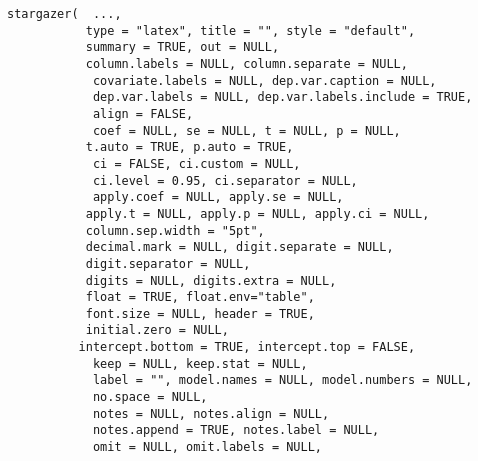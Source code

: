 \documentclass[11pt]{article}
\begin{document}
\verb+stargazer(  ..., +\\
 \verb+           type = "latex", title = "", style = "default", +\\
 \verb+           summary = TRUE, out = NULL,+\\
 \verb+           column.labels = NULL, column.separate = NULL,+\\
\verb+            covariate.labels = NULL, dep.var.caption = NULL,+\\
\verb+            dep.var.labels = NULL, dep.var.labels.include = TRUE, +\\
\verb+            align = FALSE, +\\
\verb+            coef = NULL, se = NULL, t = NULL, p = NULL,+\\
 \verb+           t.auto = TRUE, p.auto = TRUE,+\\
\verb+            ci = FALSE, ci.custom = NULL,+\\
\verb+            ci.level = 0.95, ci.separator = NULL,+\\
\verb+            apply.coef = NULL, apply.se = NULL, +\\
 \verb+           apply.t = NULL, apply.p = NULL, apply.ci = NULL,+\\
 \verb+           column.sep.width = "5pt",+\\
 \verb+           decimal.mark = NULL, digit.separate = NULL, +\\
 \verb+           digit.separator = NULL,+\\
 \verb+           digits = NULL, digits.extra = NULL,+\\
 \verb+           float = TRUE, float.env="table",+\\
 \verb+           font.size = NULL, header = TRUE,+\\
 \verb+           initial.zero = NULL, +\\
  \verb+          intercept.bottom = TRUE, intercept.top = FALSE, +\\
\verb+            keep = NULL, keep.stat = NULL,+\\
\verb+            label = "", model.names = NULL, model.numbers = NULL,+\\
\verb+            no.space = NULL,+\\
\verb+            notes = NULL, notes.align = NULL, +\\
\verb+            notes.append = TRUE, notes.label = NULL, +\\
\verb+            omit = NULL, omit.labels = NULL, +\\
\end{document}
